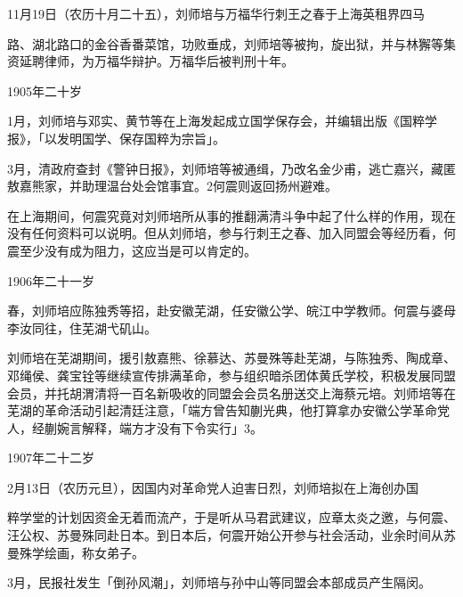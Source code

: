11月19日（农历十月二十五），刘师培与万福华行刺王之春于上海英租界四马

\vfill
\begin{BookNotes}
\end{BookNotes}

\noindent 路、湖北路口的金谷香番菜馆，功败垂成，刘师培等被拘，旋出狱，并与林獬等集资延聘律师，为万福华辩护。万福华后被判刑十年。

1905年二十岁

1月，刘师培与邓实、黄节等在上海发起成立国学保存会，并编辑出版《国粹学报》，「以发明国学、保存国粹为宗旨」。

3月，清政府查封《警钟日报》，刘师培等被通缉，乃改名金少甫，逃亡嘉兴，藏匿敖嘉熊家，并助理温台处会馆事宜。2何震则返回扬州避难。

在上海期间，何震究竟对刘师培所从事的推翻满清斗争中起了什么样的作用，现在没有任何资料可以说明。但从刘师培，参与行刺王之春、加入同盟会等经历看，何震至少没有成为阻力，这应当是可以肯定的。

1906年二十一岁

春，刘师培应陈独秀等招，赴安徽芜湖，任安徽公学、皖江中学教师。何震与婆母李汝同往，住芜湖弋矶山。

刘师培在芜湖期间，援引敖嘉熊、徐慕达、苏曼殊等赴芜湖，与陈独秀、陶成章、邓绳侯、龚宝铨等继续宣传排满革命，参与组织暗杀团体黄氏学校，积极发展同盟会员，并托胡渭清将一百名新吸收的同盟会会员名册送交上海蔡元培。刘师培等在芜湖的革命活动引起清廷注意，「端方曾告知蒯光典，他打算拿办安徽公学革命党人，经蒯婉言解释，端方才没有下令实行」3。

1907年二十二岁

2月13日（农历元旦），因国内对革命党人迫害日烈，刘师培拟在上海创办国

\vfill
\begin{BookNotes}
\end{BookNotes}

\noindent 粹学堂的计划因资金无着而流产，于是听从马君武建议，应章太炎之邀，与何震、汪公权、苏曼殊同赴日本。到日本后，何震开始公开参与社会活动，业余时间从苏曼殊学绘画，称女弟子。

3月，民报社发生「倒孙风潮」，刘师培与孙中山等同盟会本部成员产生隔闵。

